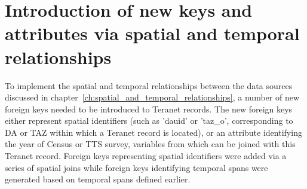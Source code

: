 \section{Introduction of new keys and attributes via spatial and temporal relationships} \label{sec:introduction_of_new_keys}

To implement the spatial and temporal relationships between the data sources discussed in chapter~\ref{ch:spatial_and_temporal_relationships}, a number of new foreign keys needed to be introduced to Teranet records.
The new foreign keys either represent spatial identifiers (such as 'dauid' or 'taz\_o', corresponding to DA or TAZ within which a Teranet record is located), or an attribute identifying the year of Census or TTS survey, variables from which can be joined with this Teranet record.
Foreign keys representing spatial identifiers were added via a series of spatial joins while foreign keys identifying temporal spans were generated based on temporal spans defined earlier.

\vspace{5mm}

